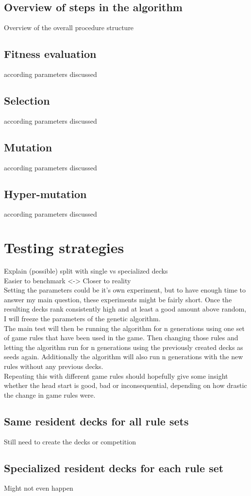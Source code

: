 \subsection{Overview of steps in the algorithm}
\label{sec:method:genalg:overview}
Overview of the overall procedure structure 

\subsection{Fitness evaluation}
\label{sec:method:genalg:fitness}
according parameters discussed

\subsection{Selection}
\label{sec:method:genalg:selection}
according parameters discussed

\subsection{Mutation}
\label{sec:method:genalg:mutation}
according parameters discussed

\subsection{Hyper-mutation}
\label{sec:method:genalg:hyper_mutation}
according parameters discussed


\section{Testing strategies}
\label{sec:method:testing}
Explain (possible) split with single vs specialized decks \\
Easier to benchmark <-> Closer to reality \\
Setting the parameters could be it’s own experiment, but to have enough time to answer my main question, these experiments might be fairly short. Once the resulting decks rank consistently high and at least a good amount above random, I will freeze the parameters of the genetic algorithm. \\
The main test will then be running the algorithm for n generations using one set of game rules that have been used in the game. Then changing those rules and letting the algorithm run for n generations using the previously created decks as seeds again. Additionally the algorithm will also run n generations with the new rules without any previous decks.  \\
Repeating this with different game rules should hopefully give some insight whether the head start is good, bad or inconsequential, depending on how drastic the change in game rules were. \\

\subsection{Same resident decks for all rule sets}
\label{sec:method:testing:single}
Still need to create the decks or competition

\subsection{Specialized resident decks for each rule set}
\label{sec:method:testing:special}
Might not even happen
